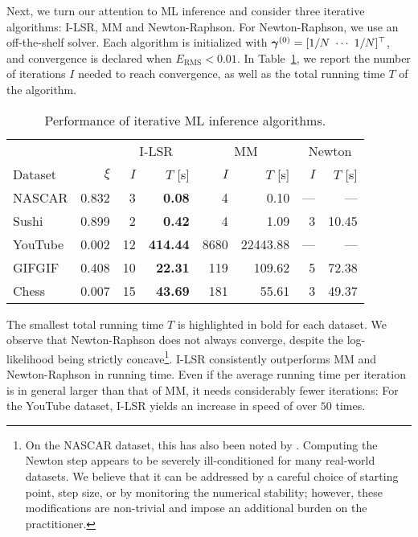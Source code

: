 Next, we turn our attention to ML inference and consider three iterative algorithms: I-LSR, MM and Newton-Raphson.
For Newton-Raphson, we use an off-the-shelf solver.
Each algorithm is initialized with $\bm{\gamma}^{(0)} = [1/N \  \cdots \  1/N]^\top$, and convergence is declared when $E_{\text{RMS}} < 0.01$.
In Table~\ref{fi:tab:mlalg}, we report the number of iterations $I$ needed to reach convergence, as well as the total running time $T$ of the algorithm.

\begin{table}[ht]
  \caption{Performance of iterative ML inference algorithms.}
  \label{fi:tab:mlalg}
  \centering
  \small{
  \begin{tabular}{l r rr rr rr}
    \toprule
             &             & \multicolumn{2}{c}{I-LSR}        & \multicolumn{2}{c}{MM}      & \multicolumn{2}{c}{Newton} \\
                             \cmidrule(l){3-4}                  \cmidrule(l){5-6}             \cmidrule(l){7-8}
    Dataset  & $\xi$               & $I$ &         $T$ [s] &        $I$ &        $T$ [s] &     $I$ &     $T$ [s] \\
    \midrule
    NASCAR   & \num{0.832} &  \num{3} &   \bfseries\num{0.08} &    \num{4} &     \num{0.10} &     --- &         --- \\
    Sushi    & \num{0.899} &  \num{2} &   \bfseries\num{0.42} &    \num{4} &     \num{1.09} & \num{3} & \num{10.45} \\
    \addlinespace
    YouTube  & \num{0.002} & \num{12} & \bfseries\num{414.44} & \num{8680} & \num{22443.88} &     --- &         --- \\
    GIFGIF   & \num{0.408} & \num{10} &  \bfseries\num{22.31} &  \num{119} &   \num{109.62} & \num{5} & \num{72.38} \\
    \addlinespace
    Chess    & \num{0.007} & \num{15} &  \bfseries\num{43.69} &  \num{181} &    \num{55.61} & \num{3} & \num{49.37} \\
    \bottomrule
  \end{tabular}
  }
\end{table}

The smallest total running time $T$ is highlighted in bold for each dataset.
We observe that Newton-Raphson does not always converge, despite the log-likelihood being strictly concave\footnote{
On the NASCAR dataset, this has also been noted by \citet{hunter2004mm}.
Computing the Newton step appears to be severely ill-conditioned for many real-world datasets.
We believe that it can be addressed by a careful choice of starting point, step size, or by monitoring the numerical stability;
however, these modifications are non-trivial and impose an additional burden on the practitioner.
}.
I-LSR consistently outperforms MM and Newton-Raphson in running time.
Even if the average running time per iteration is in general larger than that of MM, it needs considerably fewer iterations:
For the YouTube dataset, I-LSR yields an increase in speed of over $50$ times.

